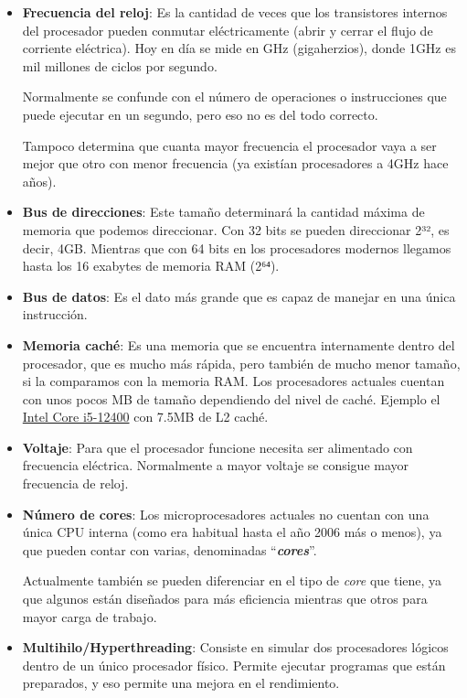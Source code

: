\begin{itemize}
    \item \textbf{Frecuencia del reloj}: Es la cantidad de veces que los transistores internos del procesador pueden conmutar eléctricamente (abrir y cerrar el flujo de corriente eléctrica). Hoy en día se mide en GHz (gigaherzios), donde 1GHz es mil millones de ciclos por segundo.

    Normalmente se confunde con el número de operaciones o instrucciones que puede ejecutar en un segundo, pero eso no es del todo correcto.

    Tampoco determina que cuanta mayor frecuencia el procesador vaya a ser mejor que otro con menor frecuencia (ya existían procesadores a 4GHz hace años).

    \item \textbf{Bus de direcciones}: Este tamaño determinará la cantidad máxima de memoria que podemos direccionar. Con 32 bits se pueden direccionar 2³², es decir, 4GB. Mientras que con 64 bits en los procesadores modernos llegamos hasta los 16 exabytes de memoria RAM (2⁶⁴).

    \item \textbf{Bus de datos}: Es el dato más grande que es capaz de manejar en una única instrucción.

    \item \textbf{Memoria caché}: Es una memoria que se encuentra internamente dentro del procesador, que es mucho más rápida, pero también de mucho menor tamaño, si la comparamos con la memoria RAM. Los procesadores actuales cuentan con unos pocos MB de tamaño dependiendo del nivel de caché. Ejemplo el \href{https://ark.intel.com/content/www/us/en/ark/products/134586/intel-core-i512400-processor-18m-cache-up-to-4-40-ghz.html}{Intel Core i5-12400} con 7.5MB de L2 caché.

    \item \textbf{Voltaje}: Para que el procesador funcione necesita ser alimentado con frecuencia eléctrica. Normalmente a mayor voltaje se consigue mayor frecuencia de reloj.

    \item \textbf{Número de cores}: Los microprocesadores actuales no cuentan con una única CPU interna (como era habitual hasta el año 2006 más o menos), ya que pueden contar con varias, denominadas “\textit{\textbf{cores}}”.

    Actualmente también se pueden diferenciar en el tipo de \textit{core} que tiene, ya que algunos están diseñados para más eficiencia mientras que otros para mayor carga de trabajo.

    \item \textbf{Multihilo/Hyperthreading}: Consiste en simular dos procesadores lógicos dentro de un único procesador físico. Permite ejecutar programas que están preparados, y eso permite una mejora en el rendimiento.
\end{itemize}


